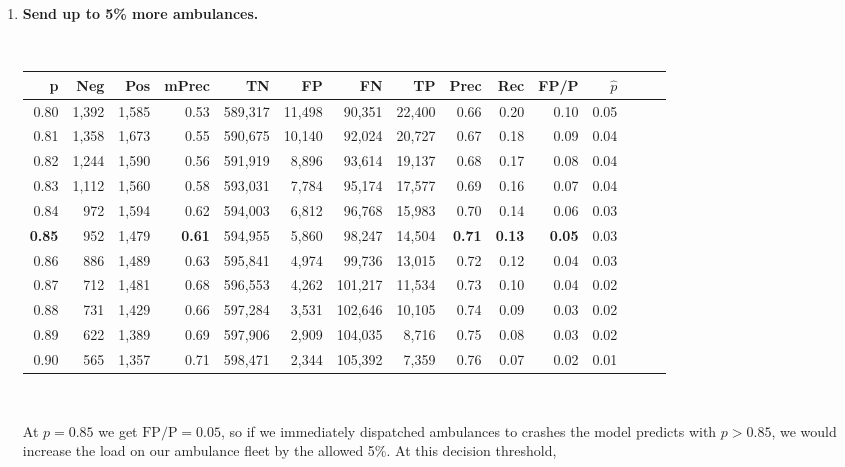 \begin{enumerate}
	\item {\bf Send up to 5\% more ambulances.}  
	
\
	
\begin{tabular}{rrrrrrrrrrrrrrr}
\toprule
p &     Neg &    Pos & mPrec &       TN &       FP &       FN &       TP &  Prec &   Rec &  FP/P & $\hat{p}$ \\
\midrule
0.80 &   1,392 &  1,585 &  0.53 &  589,317 &   11,498 &   90,351 &   22,400 &  0.66 &  0.20 &  0.10 &      0.05 \\
0.81 &   1,358 &  1,673 &  0.55 &  590,675 &   10,140 &   92,024 &   20,727 &  0.67 &  0.18 &  0.09 &      0.04 \\
0.82 &   1,244 &  1,590 &  0.56 &  591,919 &    8,896 &   93,614 &   19,137 &  0.68 &  0.17 &  0.08 &      0.04 \\
0.83 &   1,112 &  1,560 &  0.58 &  593,031 &    7,784 &   95,174 &   17,577 &  0.69 &  0.16 &  0.07 &      0.04 \\
0.84 &     972 &  1,594 &  0.62 &  594,003 &    6,812 &   96,768 &   15,983 &  0.70 &  0.14 &  0.06 &      0.03 \\
\bf 0.85 &     952 &  1,479 & \bf  0.61 &  594,955 &    5,860 &   98,247 &   14,504 & \bf 0.71 & \bf  0.13 & \bf  0.05 &      0.03 \\
0.86 &     886 &  1,489 &  0.63 &  595,841 &    4,974 &   99,736 &   13,015 &  0.72 &  0.12 &  0.04 &      0.03 \\
0.87 &     712 &  1,481 &  0.68 &  596,553 &    4,262 &  101,217 &   11,534 &  0.73 &  0.10 &  0.04 &      0.02 \\
0.88 &     731 &  1,429 &  0.66 &  597,284 &    3,531 &  102,646 &   10,105 &  0.74 &  0.09 &  0.03 &      0.02 \\
0.89 &     622 &  1,389 &  0.69 &  597,906 &    2,909 &  104,035 &    8,716 &  0.75 &  0.08 &  0.03 &      0.02 \\
0.90 &     565 &  1,357 &  0.71 &  598,471 &    2,344 &  105,392 &    7,359 &  0.76 &  0.07 &  0.02 &      0.01 \\
\bottomrule
\end{tabular}

\

At $p=0.85$ we get $\text{FP/P} = 0.05$, so if we immediately dispatched ambulances to crashes the model predicts with $p > 0.85$, we would increase the load on our ambulance fleet by the allowed 5\%.  At this decision threshold, 


\end{enumerate}
